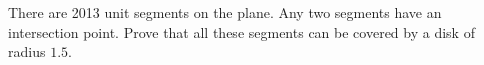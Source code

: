 \problem
There are 2013 unit segments on the plane.
Any two segments have an intersection point.
Prove that all these segments can be covered by a disk of radius $1.5$.

\solution

\endproblem
